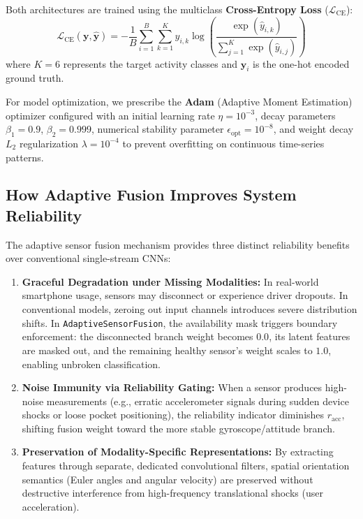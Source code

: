 Both architectures are trained using the multiclass \textbf{Cross-Entropy Loss} ($\mathcal{L}_{\text{CE}}$):
\begin{equation}
    \mathcal{L}_{\text{CE}}(\mathbf{y}, \hat{\mathbf{y}}) = -\frac{1}{B} \sum_{i=1}^{B} \sum_{k=1}^{K} y_{i, k} \log \left( \frac{\exp(\hat{y}_{i, k})}{\sum_{j=1}^{K} \exp(\hat{y}_{i, j})} \right)
\end{equation}
where $K = 6$ represents the target activity classes and $\mathbf{y}_i$ is the one-hot encoded ground truth.

For model optimization, we prescribe the \textbf{Adam} (Adaptive Moment Estimation) optimizer configured with an initial learning rate $\eta = 10^{-3}$, decay parameters $\beta_1 = 0.9$, $\beta_2 = 0.999$, numerical stability parameter $\epsilon_{\text{opt}} = 10^{-8}$, and weight decay $L_2$ regularization $\lambda = 10^{-4}$ to prevent overfitting on continuous time-series patterns.

\subsection{How Adaptive Fusion Improves System Reliability}
\label{subsec:reliability_justification}

The adaptive sensor fusion mechanism provides three distinct reliability benefits over conventional single-stream CNNs:
\begin{enumerate}
    \item \textbf{Graceful Degradation under Missing Modalities:} In real-world smartphone usage, sensors may disconnect or experience driver dropouts. In conventional models, zeroing out input channels introduces severe distribution shifts. In \texttt{AdaptiveSensorFusion}, the availability mask triggers boundary enforcement: the disconnected branch weight becomes $0.0$, its latent features are masked out, and the remaining healthy sensor's weight scales to $1.0$, enabling unbroken classification.
    \item \textbf{Noise Immunity via Reliability Gating:} When a sensor produces high-noise measurements (e.g., erratic accelerometer signals during sudden device shocks or loose pocket positioning), the reliability indicator diminishes $r_{\text{acc}}$, shifting fusion weight toward the more stable gyroscope/attitude branch.
    \item \textbf{Preservation of Modality-Specific Representations:} By extracting features through separate, dedicated convolutional filters, spatial orientation semantics (Euler angles and angular velocity) are preserved without destructive interference from high-frequency translational shocks (user acceleration).
\end{enumerate}

